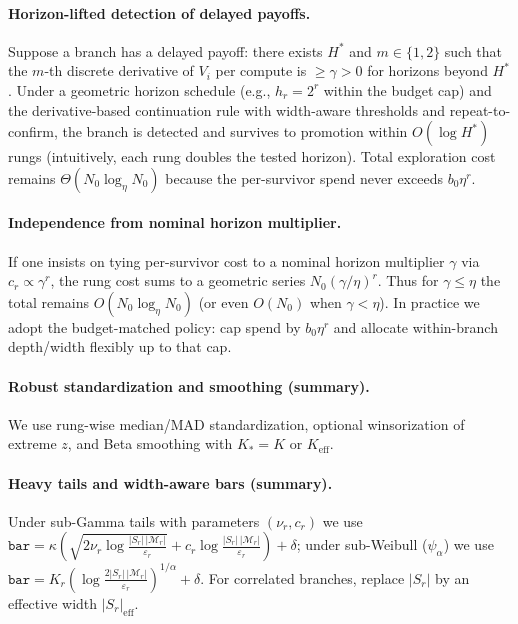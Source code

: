 \documentclass{article}
\begin{document}
\paragraph{Horizon-lifted detection of delayed payoffs.}
Suppose a branch has a delayed payoff: there exists $H^{*}$ and $m\!\in\!\{1,2\}$ such that the $m$-th discrete derivative of $V_i$ per compute is $\ge \gamma>0$ for horizons beyond $H^{*}$.
Under a geometric horizon schedule (e.g., $h_r=2^r$ within the budget cap) and the derivative-based continuation rule with width-aware thresholds and repeat-to-confirm, the branch is detected and survives to promotion within $O(\log H^{*})$ rungs (intuitively, each rung doubles the tested horizon).
Total exploration cost remains $\Theta(N_0 \log_\eta N_0)$ because the per-survivor spend never exceeds $b_0\eta^r$.

\paragraph{Independence from nominal horizon multiplier.}
If one insists on tying per-survivor cost to a nominal horizon multiplier $\gamma$ via $c_r\propto \gamma^r$, the rung cost sums to a geometric series $N_0(\gamma/\eta)^r$.
Thus for $\gamma\le\eta$ the total remains $O(N_0\log_\eta N_0)$ (or even $O(N_0)$ when $\gamma<\eta$).
In practice we adopt the budget-matched policy: cap spend by $b_0\eta^r$ and allocate within-branch depth/width flexibly up to that cap.

\vspace{0.5em}



\paragraph{Robust standardization and smoothing (summary).}
We use rung-wise median/MAD standardization, optional winsorization of extreme $z$, and Beta smoothing with $K_{*}{=}K$ or $K_{\mathrm{eff}}$.
\paragraph{Heavy tails and width-aware bars (summary).}
Under sub-Gamma tails with parameters $(\nu_r,c_r)$ we use
$\texttt{bar}=\kappa(\sqrt{2\nu_r\log \frac{|S_r|\,|\mathcal{M}_r|}{\varepsilon_r}}+c_r\log \frac{|S_r|\,|\mathcal{M}_r|}{\varepsilon_r})+\delta$;
under sub-Weibull ($\psi_\alpha$) we use $\texttt{bar}=K_r(\log \frac{2|S_r|\,|\mathcal{M}_r|}{\varepsilon_r})^{1/\alpha}+\delta$.
For correlated branches, replace $|S_r|$ by an effective width $|S_r|_{\mathrm{eff}}$.
\end{document}

